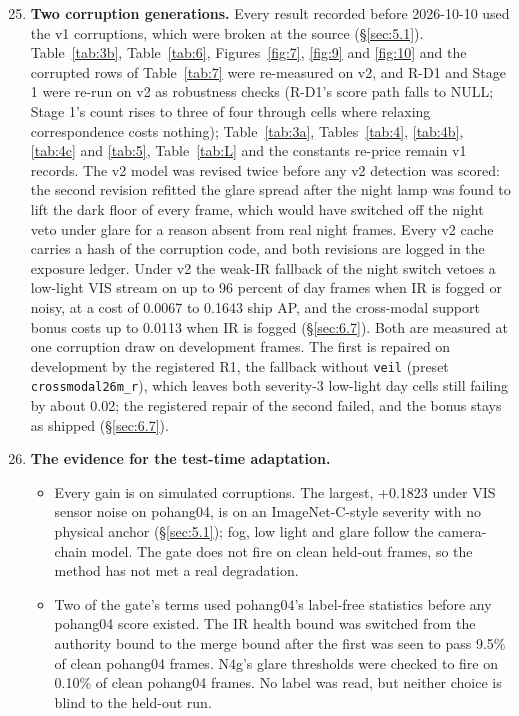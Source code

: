 \documentclass[10pt]{article}
\begin{document}
\begin{enumerate}
\setcounter{enumi}{24}
\item \textbf{Two corruption generations.} Every result recorded before 2026-10-10 used the v1 corruptions, which were broken at the source (\S\ref{sec:5.1}). Table~\ref{tab:3b}, Table~\ref{tab:6}, Figures~\ref{fig:7}, \ref{fig:9} and \ref{fig:10} and the corrupted rows of Table~\ref{tab:7} were re-measured on v2, and R-D1 and Stage 1 were re-run on v2 as robustness checks (R-D1's score path falls to NULL; Stage 1's count rises to three of four through cells where relaxing correspondence costs nothing); Table~\ref{tab:3a}, Tables~\ref{tab:4}, \ref{tab:4b}, \ref{tab:4c} and \ref{tab:5}, Table~\ref{tab:L} and the constants re-price remain v1 records. The v2 model was revised twice before any v2 detection was scored: the second revision refitted the glare spread after the night lamp was found to lift the dark floor of every frame, which would have switched off the night veto under glare for a reason absent from real night frames. Every v2 cache carries a hash of the corruption code, and both revisions are logged in the exposure ledger. Under v2 the weak-IR fallback of the night switch vetoes a low-light VIS stream on up to 96 percent of day frames when IR is fogged or noisy, at a cost of 0.0067 to 0.1643 ship AP, and the cross-modal support bonus costs up to 0.0113 when IR is fogged (\S\ref{sec:6.7}). Both are measured at one corruption draw on development frames. The first is repaired on development by the registered R1, the fallback without \texttt{veil} (preset \texttt{crossmodal26m\_\allowbreak{}r}), which leaves both severity-3 low-light day cells still failing by about 0.02; the registered repair of the second failed, and the bonus stays as shipped (\S\ref{sec:6.7}).
\item \textbf{The evidence for the test-time adaptation.}
\begin{itemize}
\item Every gain is on simulated corruptions. The largest, +0.1823 under VIS sensor noise on pohang04, is on an ImageNet-C-style severity with no physical anchor (\S\ref{sec:5.1}); fog, low light and glare follow the camera-chain model. The gate does not fire on clean held-out frames, so the method has not met a real degradation.
\item Two of the gate's terms used pohang04's label-free statistics before any pohang04 score existed. The IR health bound was switched from the authority bound to the merge bound after the first was seen to pass 9.5\% of clean pohang04 frames. N4g's glare thresholds were checked to fire on 0.10\% of clean pohang04 frames. No label was read, but neither choice is blind to the held-out run.

\end{itemize}
\end{enumerate}
\end{document}
